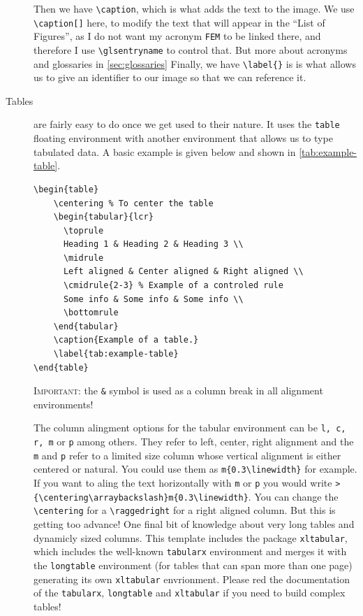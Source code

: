 \begin{description}
	Then we have \verb|\caption|, which is what adds the text to the image. We use \verb|\caption[]| here, to modify the text that will appear in the ``List of Figures'', as I do not want my acronym \texttt{FEM} to be linked there, and therefore I use \verb|\glsentryname| to control that. But more about acronyms and glossaries in \cref{sec:glossaries}
	Finally, we have \verb|\label{}| is is what allows us to give an identifier to our image so that we can reference it.
		\item[Tables] are fairly easy to do once we get used to their nature. It uses the \verb|table| floating environment with another environment that allows us to type tabulated data. A basic example is given below and shown in \cref{tab:example-table}.
\begin{lstlisting}[language={[LaTeX]TeX}]
\begin{table}
	\centering % To center the table
	\begin{tabular}{lcr}
	  \toprule
	  Heading 1 & Heading 2 & Heading 3 \\
	  \midrule
	  Left aligned & Center aligned & Right aligned \\
	  \cmidrule{2-3} % Example of a controled rule
	  Some info & Some info & Some info \\
	  \bottomrule
	\end{tabular}
	\caption{Example of a table.}
	\label{tab:example-table}
\end{table}
\end{lstlisting}
	\textsc{\color{red}Important:} the \texttt{\&} symbol is used as a column break in all alignment environments!

	The column alingment options for the tabular environment can be \texttt{l, c, r, m{}} or \texttt{p{}} among others. They refer to left, center, right alignment and the \texttt{m{}} and \texttt{p{}} refer to a limited size column whose vertical alignment is either centered or natural. You could use them as \verb|m{0.3\linewidth}| for example. If you want to aling the text horizontally with \texttt{m} or \texttt{p} you would write \verb|>{\centering\arraybackslash}m{0.3\linewidth}|. You can change the \verb|\centering| for a \verb|\raggedright| for a right aligned column. But this is getting too advance!
	One final bit of knowledge about very long tables and dynamicly sized columns. This template includes the package \texttt{xltabular}, which includes the well-known \verb|tabularx| environment and merges it with the \verb|longtable| environment (for tables that can span more than one page) generating its own \verb|xltabular| envrionment. Please red the documentation of the \texttt{tabularx}, \verb|longtable| and \verb|xltabular| if you need to build complex tables!


\end{description}
